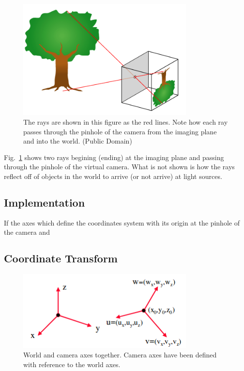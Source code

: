 \documentclass{article}
\begin{document}
\begin{figure}[!t]
\centering
\includegraphics[width=3.5in]{./imgs/Pinhole-camera}
\caption{The rays are shown in this figure as the red lines. Note how each ray passes through the pinhole
of the camera from the imaging plane and into the world. (Public Domain)}
\label{fig:pinhole}
\end{figure}

Fig.~\ref{fig:pinhole} shows two rays begining (ending) at the imaging plane and passing through the pinhole
of the virtual camera. What is not shown is how the rays reflect off of objects in the world to arrive
 (or not arrive) at light sources.

\subsection{Implementation}
If the axes which define the coordinates system with its origin at the pinhole of the camera and 

\subsection{Coordinate Transform}
\begin{figure}[!t]
\centering
\includegraphics[width=3.5in]{./imgs/axes}
\caption{World and camera axes together. Camera axes have been defined with reference to the world axes.}
\label{fig:axes}
\end{figure}
\end{document}
